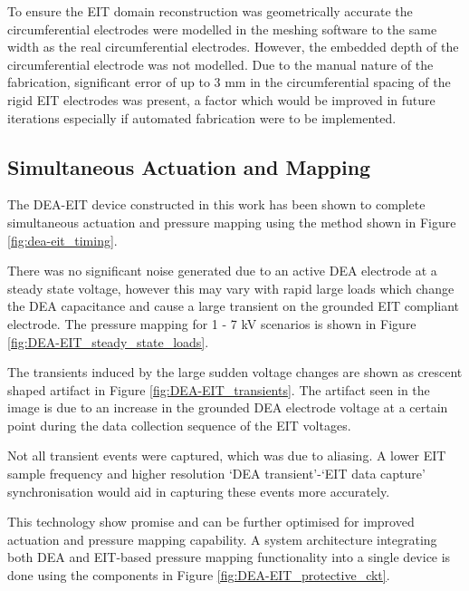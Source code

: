 To ensure the EIT domain reconstruction was geometrically accurate the circumferential electrodes were modelled in the meshing software to the same width as the real circumferential electrodes. However, the embedded depth of the circumferential electrode was not modelled. Due to the manual nature of the fabrication, significant error of up to 3 mm in the circumferential spacing of the rigid EIT electrodes was present, a factor which would be improved in future iterations especially if automated fabrication were to be implemented.


\subsection{Simultaneous Actuation and Mapping}
The DEA-EIT device constructed in this work has been shown to complete simultaneous actuation and pressure mapping using the method shown in Figure \ref{fig:dea-eit_timing}.

There was no significant noise generated due to an active DEA electrode at a steady state voltage, however this may vary with rapid large loads which change the DEA capacitance and cause a large transient on the grounded EIT compliant electrode. The pressure mapping for 1 - 7 kV scenarios is shown in Figure \ref{fig:DEA-EIT_steady_state_loads}. 

The transients induced by the large sudden voltage changes are shown as crescent shaped artifact in Figure \ref{fig:DEA-EIT_transients}. The artifact seen in the image is due to an increase in the grounded DEA electrode voltage at a certain point during the data collection sequence of the EIT voltages. 

Not all transient events were captured, which was due to aliasing. A lower EIT sample frequency and higher resolution `DEA transient'-`EIT data capture' synchronisation would aid in capturing these events more accurately.

This technology show promise and can be further optimised for improved actuation and pressure mapping capability. A system architecture integrating both DEA and EIT-based pressure mapping functionality into a single device is done using the components in Figure \ref{fig:DEA-EIT_protective_ckt}. 


